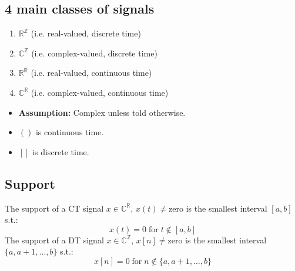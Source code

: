\subsection{4 main classes of signals}
\begin{definition}
    \begin{enumerate}
        \item $\mathbb{R}^\mathbb{Z}$ (i.e. real-valued, discrete time)
        \item $\mathbb{C}^\mathbb{Z}$ (i.e. complex-valued, discrete time)
        \item $\mathbb{R}^\mathbb{R}$ (i.e. real-valued, continuous time)
        \item $\mathbb{C}^\mathbb{R}$ (i.e. complex-valued, continuous time)
    \end{enumerate}

    \begin{itemize}
        \item \textbf{Assumption:} Complex unless told otherwise.
    \end{itemize}
\end{definition}

\begin{intuition}
    \begin{itemize}
        \item $()$ is continuous time. 
        \item $[]$ is discrete time.
    \end{itemize}
\end{intuition}

\subsection{Support}
\begin{definition}
    The support of a CT signal \( x \in \mathbb{C}^{\mathbb{R}} \), $x(t) \neq \text{zero}$ is the smallest interval $[a,b]$ s.t.:
    \[
    x(t) = 0 \; \text{for} \; t \notin [a, b] 
    \]
    The support of a DT signal \( x \in \mathbb{C}^{\mathbb{Z}} \), $x[n] \neq \text{zero}$ is the smallest interval $\{a,a+1,\ldots,b\}$ s.t.:
    \[
    x[n] = 0 \; \text{for} \; n \notin \{a, a+1,\ldots,b\} 
    \]
\end{definition}

